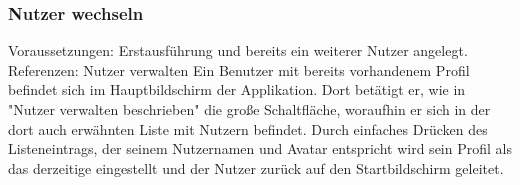 \subsubsection{Nutzer wechseln}
Voraussetzungen: Erstausführung und bereits ein weiterer Nutzer angelegt.\newline
Referenzen: Nutzer verwalten
\newline
\newline
Ein Benutzer mit bereits vorhandenem Profil befindet sich im Hauptbildschirm 
der Applikation. Dort betätigt er, wie in "Nutzer verwalten beschrieben" die
große Schaltfläche, woraufhin er sich in der dort auch erwähnten Liste
mit Nutzern befindet. Durch einfaches Drücken des Listeneintrags, der
seinem Nutzernamen und Avatar entspricht wird sein Profil als das derzeitige 
eingestellt und der Nutzer zurück auf den Startbildschirm geleitet.
